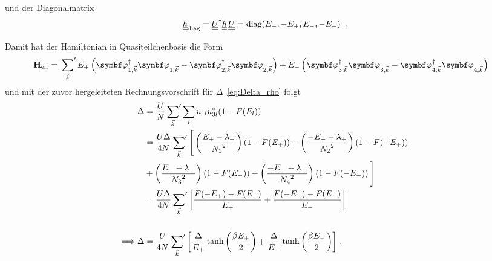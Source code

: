 und der Diagonalmatrix 
\begin{align}
    \underline{\underline{h}}_\text{diag} = \underline{\underline{U}}^\dagger \underline{\underline{h}} \, \underline{\underline{U}} =\text{diag}(E_+, -E_+, E_-, -E_-)~\label{eq:h_diag_nothalf} \, .
\end{align}

Damit hat der Hamiltonian in Quasiteilchenbasis die Form
\begin{align}
    \oHeff &= \sump{\vk}E_+\left(\ophioned \ophione - \ophitwod \ophitwo\right) + E_- \left(\ophithreed \ophithree - \ophifourd \ophifour\right)
\end{align}
und mit der zuvor hergeleiteten Rechnungsvorschrift für $\Delta$~\eqref{eq:Delta_rho} folgt 
\begin{align}
    \Delta &= \frac{U}{N} \sideset{}{'}\sum_{{\vec{k}}} \sum_l u_{1l} u_{3l}^* (1 - F(E_l)) \\
    &= \frac{U \Delta}{4N} \sideset{}{'}\sum_{{\vec{k}}}\Bigg[\left(\frac{E_+ - \lambda_+}{{N_1}^2}\right)\left(1 - F(E_+)\right) + \left(\frac{-E_+ - \lambda_+}{{N_2}^2}\right)\left(1 - F(-E_+)\right) \\
    &+ \left(\frac{E_- - \lambda_-}{{N_3}^2}\right)\left(1 - F(E_-)\right) + \left(\frac{-E_- - \lambda_-}{{N_4}^2}\right)\left(1 - F(-E_-)\right)\Bigg] \notag \\
    &= \frac{U \Delta}{4N} \sideset{}{'}\sum_{{\vec{k}}} \left[\frac{F(-E_+) - F(E_+)}{E_+} + \frac{F(-E_-) - F(E_-)}{E_-} \right] \\ \notag \\
    \Longrightarrow  \Delta &= \frac{U}{4N} \sideset{}{'}\sum_{{\vec{k}}} \left[\frac{\Delta}{E_+} \tanh\left(\frac{\beta E_+}{2}\right) + \frac{\Delta}{E_-} \tanh\left(\frac{\beta E_-}{2}\right)\right] \, .
\end{align}


